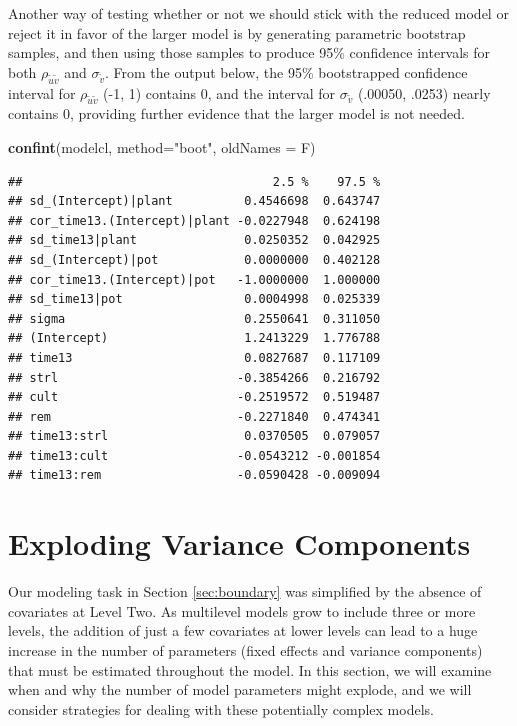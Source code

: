 \documentclass[
]{krantz}
\newenvironment{Shaded}{\begin{snugshade}}{\end{snugshade}}
\newcommand{\DataTypeTok}[1]{\textcolor[rgb]{0.27,0.27,0.27}{#1}}
\newcommand{\KeywordTok}[1]{\textcolor[rgb]{0.27,0.27,0.27}{\textbf{#1}}}
\newcommand{\NormalTok}[1]{#1}
\newcommand{\StringTok}[1]{\textcolor[rgb]{0.5,0.5,0.5}{#1}}
\begin{document}
Another way of testing whether or not we should stick with the reduced model or reject it in favor of the larger model is by generating parametric bootstrap samples, and then using those samples to produce 95\% confidence intervals for both \(\rho_{\tilde{u}\tilde{v}}\) and \(\sigma_{\tilde{v}}\). From the output below, the 95\% bootstrapped confidence interval for \(\rho_{\tilde{u}\tilde{v}}\) (-1, 1) contains 0, and the interval for \(\sigma_{\tilde{v}}\) (.00050, .0253) nearly contains 0, providing further evidence that the larger model is not needed.

\begin{Shaded}
\begin{Highlighting}[]
\KeywordTok{confint}\NormalTok{(modelcl, }\DataTypeTok{method=}\StringTok{"boot"}\NormalTok{, }\DataTypeTok{oldNames =}\NormalTok{ F)}
\end{Highlighting}
\end{Shaded}

\begin{verbatim}
##                                   2.5 %    97.5 %
## sd_(Intercept)|plant          0.4546698  0.643747
## cor_time13.(Intercept)|plant -0.0227948  0.624198
## sd_time13|plant               0.0250352  0.042925
## sd_(Intercept)|pot            0.0000000  0.402128
## cor_time13.(Intercept)|pot   -1.0000000  1.000000
## sd_time13|pot                 0.0004998  0.025339
## sigma                         0.2550641  0.311050
## (Intercept)                   1.2413229  1.776788
## time13                        0.0827687  0.117109
## strl                         -0.3854266  0.216792
## cult                         -0.2519572  0.519487
## rem                          -0.2271840  0.474341
## time13:strl                   0.0370505  0.079057
## time13:cult                  -0.0543212 -0.001854
## time13:rem                   -0.0590428 -0.009094
\end{verbatim}

\hypertarget{sec:explodingvarcomps}{%
\section{Exploding Variance Components}\label{sec:explodingvarcomps}}

Our modeling task in Section \ref{sec:boundary} was simplified by the absence of covariates at Level Two. As multilevel models grow to include three or more levels, the addition of just a few covariates at lower levels can lead to a huge increase in the number of parameters (fixed effects and variance components)  that must be estimated throughout the model. In this section, we will examine when and why the number of model parameters might explode, and we will consider strategies for dealing with these potentially complex models.
\end{document}

